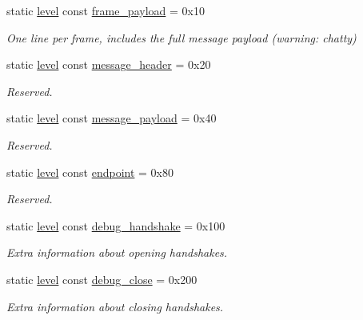 \begin{DoxyCompactItemize}
static \hyperlink{namespacewebsocketpp_1_1log_a12d4d17939f102db8c9183d400a41960}{level} const \hyperlink{structwebsocketpp_1_1log_1_1alevel_aa38cfdf7a82f33cac319438462707e90}{frame\+\_\+payload} = 0x10
\begin{DoxyCompactList}\small\item\em One line per frame, includes the full message payload (warning\+: chatty) \end{DoxyCompactList}\item 
static \hyperlink{namespacewebsocketpp_1_1log_a12d4d17939f102db8c9183d400a41960}{level} const \hyperlink{structwebsocketpp_1_1log_1_1alevel_ae05d0972bc4d68cca49faf8c82d40304}{message\+\_\+header} = 0x20
\begin{DoxyCompactList}\small\item\em Reserved. \end{DoxyCompactList}\item 
static \hyperlink{namespacewebsocketpp_1_1log_a12d4d17939f102db8c9183d400a41960}{level} const \hyperlink{structwebsocketpp_1_1log_1_1alevel_ace7d9b9c9ed82029ec93c4f45081b7ac}{message\+\_\+payload} = 0x40
\begin{DoxyCompactList}\small\item\em Reserved. \end{DoxyCompactList}\item 
static \hyperlink{namespacewebsocketpp_1_1log_a12d4d17939f102db8c9183d400a41960}{level} const \hyperlink{structwebsocketpp_1_1log_1_1alevel_ad35433a6b8793f2bd1f5595386a09c73}{endpoint} = 0x80
\begin{DoxyCompactList}\small\item\em Reserved. \end{DoxyCompactList}\item 
static \hyperlink{namespacewebsocketpp_1_1log_a12d4d17939f102db8c9183d400a41960}{level} const \hyperlink{structwebsocketpp_1_1log_1_1alevel_a5756fbbc77e431534a43072f944283fc}{debug\+\_\+handshake} = 0x100
\begin{DoxyCompactList}\small\item\em Extra information about opening handshakes. \end{DoxyCompactList}\item 
static \hyperlink{namespacewebsocketpp_1_1log_a12d4d17939f102db8c9183d400a41960}{level} const \hyperlink{structwebsocketpp_1_1log_1_1alevel_a8af43767d3814885f55495bf9f5f4df4}{debug\+\_\+close} = 0x200
\begin{DoxyCompactList}\small\item\em Extra information about closing handshakes. \end{DoxyCompactList}\item 

\end{DoxyCompactItemize}
